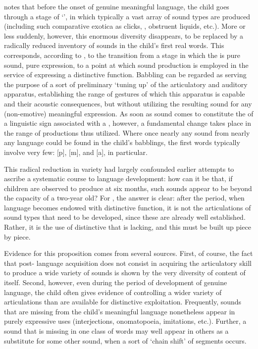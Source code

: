 {\Jakobson} notes that before the onset of genuine meaningful language,
the child goes through a stage of `', in which typically a
vast array of sound types are produced (including such comparative
exotica as clicks, , obstruent liquids, etc.).  More or
less suddenly, however, this enormous diversity disappears, to be
replaced by a radically reduced inventory of sounds in the child's
first real words. This corresponds, according to {\Jakobson}, to the
transition from a stage in which the  is pure sound, pure
expression, to a point at which sound production is employed in the
service of expressing a distinctive function. Babbling can be regarded
as serving the purpose of a sort of preliminary `tuning up' of the
articulatory and auditory apparatus, establishing the range of
gestures of which this apparatus is capable and their acoustic
consequences, but without utilizing the resulting sound for any
(non-emotive) meaningful expression. As soon as sound comes to
constitute the \emph{} of a linguistic sign associated with
a \emph{}, however, a fundamental {change} takes place in the
range of productions thus utilized. Where once nearly any sound from
nearly any language could be found in the child's babblings, the first
words typically involve very few: [p], [m], and [a], in particular.

This radical reduction in variety had largely confounded earlier
attempts to ascribe a systematic course to language development: how
can it be that, if children are observed to produce  at
six months, such sounds appear to be beyond the capacity of a two-year
old? For {\Jakobson}, the answer is clear: after the  period,
when language becomes endowed with distinctive function, it is not the
articulations of sound types that need to be developed, since these
are already well established. Rather, it is the use of distinctive
 that is lacking, and this must be built up piece by
piece.

Evidence for this proposition comes from several sources. First, of
course, the fact that post- language acquisition does not
consist in acquiring the articulatory skill to produce a wide variety
of sounds is shown by the very diversity of content of 
itself. Second, however, even during the period of development of
genuine language, the child often gives evidence of controlling a
wider variety of articulations than are available for distinctive
exploitation. Frequently, sounds that are missing from the child's
meaningful language nonetheless appear in purely expressive uses
(interjections, onomatopoeia, imitations, etc.). Further, a sound that
is missing in one class of words may well appear in others as a
substitute for some other sound, when a sort of `chain shift' of
segments occurs.

